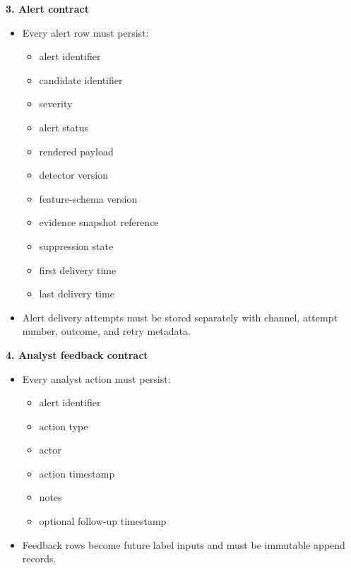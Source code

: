 \documentclass{article}
\begin{document}
\textbf{3. Alert contract}
\begin{itemize}
\item Every alert row must persist:
\begin{itemize}
\item alert identifier
\item candidate identifier
\item severity
\item alert status
\item rendered payload
\item detector version
\item feature-schema version
\item evidence snapshot reference
\item suppression state
\item first delivery time
\item last delivery time
\end{itemize}
\item Alert delivery attempts must be stored separately with channel, attempt number, outcome, and retry metadata.
\end{itemize}

\textbf{4. Analyst feedback contract}
\begin{itemize}
\item Every analyst action must persist:
\begin{itemize}
\item alert identifier
\item action type
\item actor
\item action timestamp
\item notes
\item optional follow-up timestamp
\end{itemize}
\item Feedback rows become future label inputs and must be immutable append records.
\end{itemize}
\end{document}
